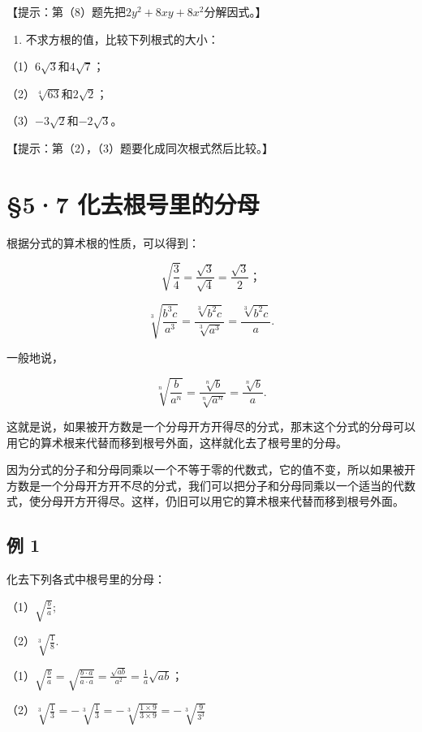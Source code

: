 【提示：第（8）题先把\(2y^{2} + 8xy + 8x^{2}\)分解因式。】

\begin{enumerate}[start=4]
\item
  不求方根的值，比较下列根式的大小：
\end{enumerate}

（1）\(6\sqrt{3}\)和\(4\sqrt{7}\)；

（2）\(\sqrt[4]{63}\)和\(2\sqrt{2}\)；

（3）\(-3\sqrt{2}\)和\(-2\sqrt{3}\)。

【提示：第（2），（3）题要化成同次根式然后比较。】

\section{§5·7 化去根号里的分母}

根据分式的算术根的性质，可以得到：

\[
\sqrt {\frac{3}{4}} = \frac{\sqrt {3}}{\sqrt {4}} = \frac{\sqrt {3}}{2}\text{；}
\]

\[
\sqrt[3]{\frac{b ^ {3} c}{a ^ {3}}} = \frac{\sqrt[3]{b ^ {2} c}}{\sqrt[3]{a ^ {3}}} = \frac{\sqrt[3]{b ^ {2} c}}{a}.
\]

一般地说，

\[
\sqrt[n]{\frac{b}{a ^ {n}}} = \frac{\sqrt[n]{b}}{\sqrt[n]{a ^ {n}}} = \frac{\sqrt[n]{b}}{a}.
\]

这就是说，如果被开方数是一个分母开方开得尽的分式，那末这个分式的分母可以用它的算术根来代替而移到根号外面，这样就化去了根号里的分母。

因为分式的分子和分母同乘以一个不等于零的代数式，它的值不变，所以如果被开方数是一个分母开方开不尽的分式，我们可以把分子和分母同乘以一个适当的代数式，使分母开方开得尽。这样，仍旧可以用它的算术根来代替而移到根号外面。

\subsection{例 1}

化去下列各式中根号里的分母：

（1）\(\sqrt{\frac{b}{a}};\)

（2）\(\sqrt[3]{\frac{1}{8}}.\)

（1）\(\sqrt{\frac{b}{a}} = \sqrt{\frac{b \cdot a}{a \cdot a}} = \frac{\sqrt{ab}}{a^2} = \frac{1}{a} \sqrt{ab}\)；

（2）\(\sqrt[3]{\frac{1}{3}} = -\sqrt[3]{\frac{1}{3}} = -\sqrt[3]{\frac{1 \times 9}{3 \times 9}} = -\sqrt[3]{\frac{9}{3^3}}\)

